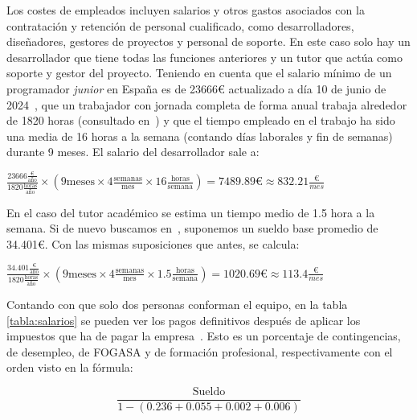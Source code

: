 Los costes de empleados incluyen salarios y otros gastos asociados con la contratación y retención de personal cualificado, como desarrolladores, diseñadores, gestores de proyectos y personal de soporte. En este caso solo hay un desarrollador que tiene todas las funciones anteriores y un tutor que actúa como soporte y gestor del proyecto. Teniendo en cuenta que el salario mínimo de un programador \textit{junior} en España es de 23666€ actualizado a día 10 de junio de 2024~\cite{salario}, que un trabajador con jornada completa de forma anual trabaja alrededor de 1820 horas (consultado en~\cite{jornadaAnual}) y que el tiempo  empleado en el trabajo ha sido una media de 16 horas a la semana (contando días laborales y fin de semanas) durante 9 meses. El salario del desarrollador sale a:
\begin{center}
	$ \frac{23666\frac{\text{€}}{\text{año}}}{1820\frac{\text{horas}}{\text{año}}} \times (9\text{meses} \times 4\frac{\text{semanas}}{\text{mes}} \times 16\frac{\text{horas}}{\text{semana}}) = 7489.89\text{€} \approx 832.21\frac{\text{€}}{mes}$
\end{center}

En el caso del tutor académico se estima un tiempo medio de 1.5 hora a la semana. Si de nuevo buscamos en~\cite{salarioProfe}, suponemos un sueldo base promedio de 34.401€. Con las mismas suposiciones que antes, se calcula:
\begin{center}
	$ \frac{34.401\frac{\text{€}}{\text{año}}}{1820\frac{\text{horas}}{\text{año}}} \times (9\text{meses} \times 4\frac{\text{semanas}}{\text{mes}} \times 1.5\frac{\text{horas}}{\text{semana}}) = 1020.69\text{€} \approx 113.4\frac{\text{€}}{mes}$
\end{center}

Contando con que solo dos personas conforman el equipo, en la tabla \ref{tabla:salarios} se pueden ver los pagos definitivos después de aplicar los impuestos que ha de pagar la empresa~\cite{impuestos}. Esto es un porcentaje de contingencias, de desempleo, de FOGASA y de formación profesional, respectivamente con el orden visto en la fórmula:

\[
\frac{\text{Sueldo}}{1-(0.236+0.055+0.002+0.006)}
\]

